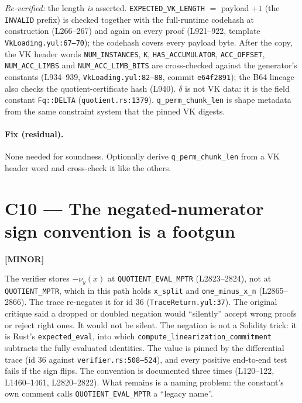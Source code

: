 \emph{Re-verified:} the length \emph{is} asserted.
\texttt{EXPECTED\_\allowbreak{}VK\_\allowbreak{}LENGTH} $=$ payload $+1$ (the \texttt{INVALID}
prefix) is checked together with the full-runtime codehash at
construction (L266--267) and again on every proof (L921--922,
template \texttt{VkLoading.yul:67--70}); the codehash covers every
payload byte. After the copy, the VK header words
\texttt{NUM\_INSTANCES}, \texttt{K}, \texttt{HAS\_ACCUMULATOR},
\texttt{ACC\_OFFSET}, \texttt{NUM\_ACC\_LIMBS} and
\texttt{NUM\_\allowbreak{}ACC\_\allowbreak{}LIMB\_\allowbreak{}BITS} are cross-checked against the
generator's constants (L934--939, \texttt{VkLoading.yul:82--88},
commit \texttt{e64f2891}); the B64 lineage also checks the
quotient-certificate hash (L940). $\delta$ is not VK data: it is the
field constant \texttt{Fq::DELTA} (\texttt{quotient.rs:1379}).
\texttt{q\_\allowbreak{}perm\_\allowbreak{}chunk\_\allowbreak{}len} is shape metadata from the same
constraint system that the pinned VK digests.

\paragraph{Fix (residual).}
None needed for soundness. Optionally derive
\texttt{q\_\allowbreak{}perm\_\allowbreak{}chunk\_\allowbreak{}len} from a VK header word and cross-check it
like the others.

\section{C10 --- The negated-numerator sign convention is a footgun}
\label{sec:c10-sign}
\textcolor{codegenblue}{\textbf{[MINOR]}} 

The verifier stores $-\nu_y(x)$ at \texttt{QUOTIENT\_\allowbreak{}EVAL\_\allowbreak{}MPTR}
(L2823--2824), not at \texttt{QUOTIENT\_MPTR}, which in this path
holds \texttt{x\_split} and \texttt{one\_minus\_x\_n} (L2865--2866).
The trace re-negates it for id 36 (\texttt{TraceReturn.yul:37}). The
original critique said a dropped or doubled negation would
``silently'' accept wrong proofs or reject right ones. It would not
be silent. The negation is not a Solidity trick: it is Rust's
\texttt{expected\_eval}, into which
\texttt{compute\_\allowbreak{}linearization\_\allowbreak{}commitment} subtracts the fully
evaluated identities. The value is pinned by the differential
trace (id 36 against \texttt{verifier.rs:508--524}), and every
positive end-to-end test fails if the sign flips. The convention is
documented three times (L120--122, L1460--1461, L2820--2822). What
remains is a naming problem: the constant's own comment calls
\texttt{QUOTIENT\_\allowbreak{}EVAL\_\allowbreak{}MPTR} a ``legacy name''.

